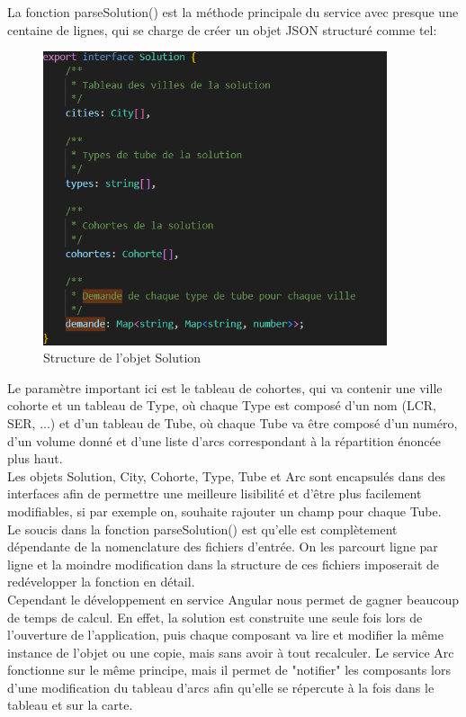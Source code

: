 \documentclass{polytech/polytech}
\numberwithin{figure}{chapter}
\begin{document}
\pagebreak

La fonction parseSolution() est la méthode principale du service avec presque une centaine de lignes, qui se charge de créer un objet JSON structuré comme tel:

\begin{figure}[h]
    \centering
    \includegraphics[width=0.9\textwidth]{pic/interfacesolution.png}
    \caption{Structure de l'objet Solution}
\end{figure}

Le paramètre important ici est le tableau de cohortes, qui va contenir une ville cohorte et un tableau de Type, où chaque Type est composé d'un nom (LCR, SER, ...) et d'un tableau de Tube, où chaque Tube va être composé d'un numéro, d'un volume donné et d'une liste d'arcs correspondant à la répartition énoncée plus haut.\\

Les objets Solution, City, Cohorte, Type, Tube et Arc sont encapsulés dans des interfaces afin de permettre une meilleure lisibilité et d'être plus facilement modifiables, si par exemple on, souhaite rajouter un champ pour chaque Tube.\\

Le soucis dans la fonction parseSolution() est qu'elle est complètement dépendante de la nomenclature des fichiers d'entrée. On les parcourt ligne par ligne et la moindre modification dans la structure de ces fichiers imposerait de redévelopper la fonction en détail.\\

Cependant le développement en service Angular nous permet de gagner beaucoup de temps de calcul. En effet, la solution est construite une seule fois lors de l'ouverture de l'application, puis chaque composant va lire et modifier la même instance de l'objet ou une copie, mais sans avoir à tout recalculer.
Le service Arc fonctionne sur le même principe, mais il permet de "notifier" les composants lors d'une modification du tableau d'arcs afin qu'elle se répercute à la fois dans le tableau et sur la carte.
\end{document}
